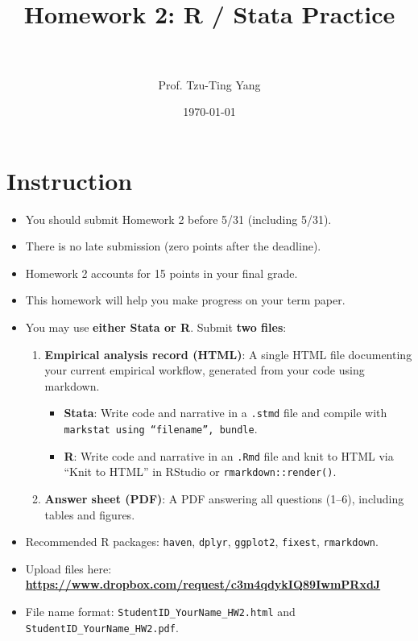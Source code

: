 \documentclass[paper=a4, fontsize=11pt]{scrartcl}
\title{
\normalfont \normalsize
\horrule{0.5pt} \\[0.4cm]
\huge Homework 2: R / Stata Practice \\
\horrule{2pt} \\[0.5cm]
}
\author{Prof. Tzu-Ting Yang}
\date{\normalsize\today}
\begin{document}
\maketitle




\section*{Instruction}

\begin{itemize}
\item[\textbullet] You should submit Homework 2 before 5/31 (including 5/31).
\item[\textbullet] There is no late submission (zero points after the deadline).
\item[\textbullet] Homework 2 accounts for 15 points in your final grade.
\item[\textbullet] This homework will help you make progress on your term paper.
\item[\textbullet] You may use \textbf{either Stata or R}. Submit \textbf{two files}:
  \begin{enumerate}
    \item \textbf{Empirical analysis record (HTML)}: A single HTML file documenting your current empirical workflow, generated from your code using markdown.
    \begin{itemize}
      \item \textbf{Stata}: Write code and narrative in a \texttt{.stmd} file and compile with \texttt{markstat using ``filename'', bundle}.
      \item \textbf{R}: Write code and narrative in an \texttt{.Rmd} file and knit to HTML via ``Knit to HTML'' in RStudio or \texttt{rmarkdown::render()}.
    \end{itemize}
    \item \textbf{Answer sheet (PDF)}: A PDF answering all questions (1--6), including tables and figures.
  \end{enumerate}
\item[\textbullet] Recommended R packages: \texttt{haven}, \texttt{dplyr}, \texttt{ggplot2}, \texttt{fixest}, \texttt{rmarkdown}.
\item[\textbullet] Upload files here: \textbf{\url{https://www.dropbox.com/request/c3m4qdykIQ89IwmPRxdJ}}
\item[\textbullet] File name format: \texttt{StudentID\_YourName\_HW2.html} and \texttt{StudentID\_YourName\_HW2.pdf}.
\end{itemize}
\end{document}
